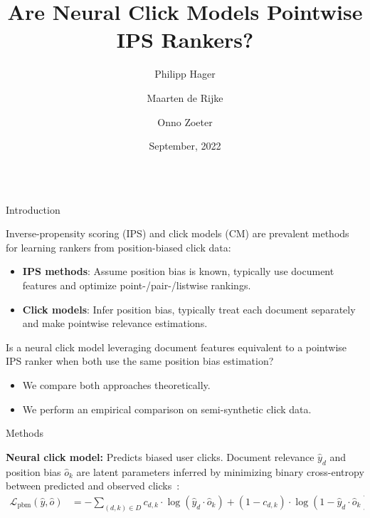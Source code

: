\documentclass[final]{beamer}
\title{\huge Are Neural Click Models Pointwise IPS Rankers?}
\author{Philipp Hager\inst{1} \and Maarten de Rijke\inst{1} \and Onno Zoeter\inst{2}}
\institute[shortinst]{\inst{1} University of Amsterdam \inst{2} Booking.com}
\date[Sep. 2022]{September, 2022}
\newlength{\onecolwid}
\begin{document}
\begin{frame}[t]
	\begin{columns}[t]
	\begin{column}{\onecolwid}
		
    \begin{block}{Introduction}

		Inverse-propensity scoring (IPS) and click models (CM) are prevalent methods for learning rankers from position-biased click data:
		\vspace{1ex}
		\begin{itemize}
			\item {\bf IPS methods}: Assume position bias is known, typically use document features and optimize point-/pair-/listwise rankings.
			\item {\bf Click models}: Infer position bias, typically treat each document separately and make pointwise relevance estimations.
		\end{itemize}
		
		\vspace{1ex}
		
		Is a neural click model leveraging document features equivalent to a pointwise IPS ranker when both use the same position bias estimation?
		
		\vspace{1ex}
		
		\begin{itemize}
			\item We compare both approaches theoretically.
			\item We perform an empirical comparison on semi-synthetic click data.
		\end{itemize}

	\end{block}

	\vspace{1ex}

	\begin{block}{Methods}

		\textbf{Neural click model:} Predicts biased user clicks. Document relevance $\hat{y}_d$ and position bias $\hat{o}_k$ are latent parameters inferred by minimizing binary cross-entropy between predicted and observed clicks~\cite{Yan2022TwoTowers}:
		\vspace{1ex}
		\begin{equation*}
			\begin{split}
			\mathcal{L}_{\text{pbm}}(\hat{y}, \hat{o}) &= - \sum_{(d, k) \in D} c_{d,k} \cdot \log(\hat{y}_{d} \cdot \hat{o}_{k}) + (1 - c_{d,k}) \cdot \log(1 - \hat{y}_{d} \cdot \hat{o}_{k}).
			\end{split}
		\end{equation*}


\end{block}
\end{column}
\end{columns}
\end{frame}
\end{document}
